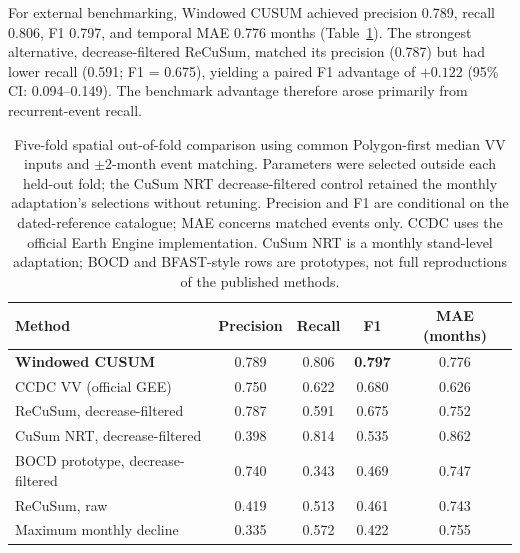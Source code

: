 For external benchmarking, Windowed CUSUM achieved precision 0.789, recall 0.806, F1 0.797, and temporal MAE 0.776 months (Table~\ref{tab:benchmark_comparison}). The strongest alternative, decrease-filtered ReCuSum, matched its precision (0.787) but had lower recall (0.591; F1 = 0.675), yielding a paired F1 advantage of $+0.122$ (95\% CI: 0.094--0.149). The benchmark advantage therefore arose primarily from recurrent-event recall.


\begin{table}[pos=!htbp]
    \centering
    \small
    \caption{Five-fold spatial out-of-fold comparison using common Polygon-first median VV inputs and $\pm2$-month event matching. Parameters were selected outside each held-out fold; the CuSum NRT decrease-filtered control retained the monthly adaptation's selections without retuning. Precision and F1 are conditional on the dated-reference catalogue; MAE concerns matched events only. CCDC uses the official Earth Engine implementation. CuSum NRT is a monthly stand-level adaptation; BOCD and BFAST-style rows are prototypes, not full reproductions of the published methods.}
    \label{tab:benchmark_comparison}

    \begin{tabular}{lcccc}
        \toprule
        Method
        & Precision
        & Recall
        & F1
        & MAE (months) \\
        \midrule

        \textbf{Windowed CUSUM}
        & 0.789
        & 0.806
        & \textbf{0.797}
        & 0.776 \\

        CCDC VV (official GEE)
        & 0.750
        & 0.622
        & 0.680
        & 0.626 \\

        ReCuSum, decrease-filtered
        & 0.787
        & 0.591
        & 0.675
        & 0.752 \\

        CuSum NRT, decrease-filtered
        & 0.398
        & 0.814
        & 0.535
        & 0.862 \\

        BOCD prototype, decrease-filtered
        & 0.740
        & 0.343
        & 0.469
        & 0.747 \\

        ReCuSum, raw
        & 0.419
        & 0.513
        & 0.461
        & 0.743 \\

        Maximum monthly decline
        & 0.335
        & 0.572
        & 0.422
        & 0.755 \\


\end{tabular}
\end{table}
